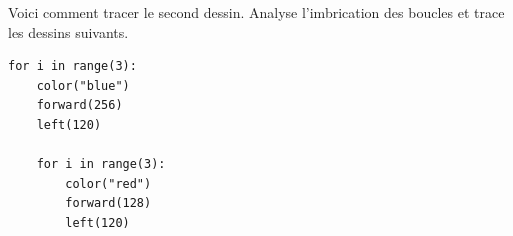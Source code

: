 \documentclass[11pt,class=report,crop=false]{standalone}
\begin{document}
\begin{activite}
Voici comment tracer le second dessin. Analyse l'imbrication des boucles et trace les dessins suivants.

\begin{center}
\begin{minipage}{0.5\textwidth}
\begin{lstlisting}
for i in range(3):
    color("blue")
    forward(256)
    left(120)

    for i in range(3):
        color("red")
        forward(128)
        left(120)
\end{lstlisting}        
\end{minipage}
\end{center}        
\end{activite}



\end{document}
